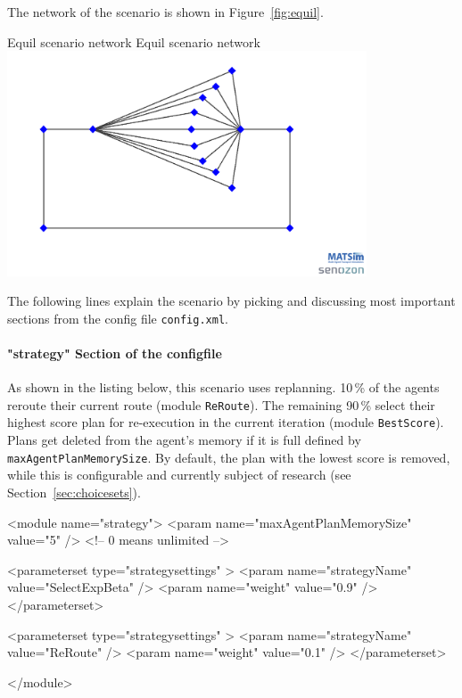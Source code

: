 The network of the scenario is shown in Figure~\ref{fig:equil}.

\createfigure%
{Equil scenario network}%
{Equil scenario network}%
{\label{fig:equil}}%
{\includegraphics[width=0.8\textwidth, angle=0]{using/figures/equil.png}}%
{}

The following lines explain the scenario by picking and discussing most important sections from the config file \lstinline|config.xml|.


\paragraph{"strategy" Section of the \protect\gls{configfile}}

As shown in the listing below, this scenario uses replanning. 10\,\% of the agents reroute their current route (module \lstinline|ReRoute|). The remaining 90\,\% select their highest score plan for re-execution in the current iteration (module \lstinline|BestScore|). Plans get deleted from the agent's memory if it is full defined by \lstinline|maxAgentPlanMemorySize|. By default, the plan with the lowest score is removed, while this is configurable and currently subject of
research (see Section~\ref{sec:choicesets}).
%
\begin{xml}
<module name="strategy">
	<param name="maxAgentPlanMemorySize" value="5" /> <!-- 0 means unlimited -->
	
	<parameterset type="strategysettings" >
		<param name="strategyName" value="SelectExpBeta" />
		<param name="weight" value="0.9" />
	</parameterset>
	
	<parameterset type="strategysettings" >
		<param name="strategyName" value="ReRoute" />
		<param name="weight" value="0.1" />
	</parameterset>
	
</module>
\end{xml}


